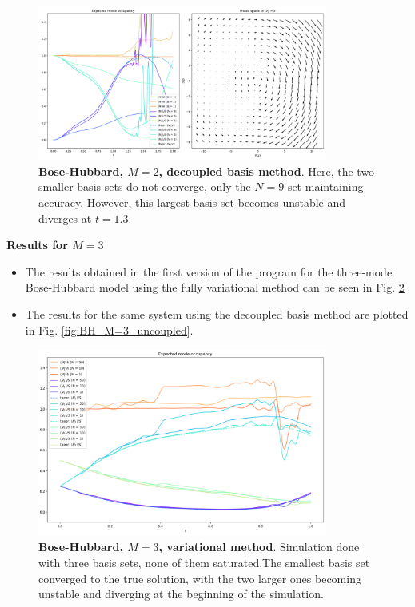 \documentclass[12pt]{article}
\begin{document}
	\begin{figure}
	\begin{center}
	\includegraphics[width=0.85\textwidth]{images/BH_M=2_uncoupled_basis}
	\caption{\textbf{Bose-Hubbard, $M=2$, decoupled basis method}. Here, the two smaller basis sets do not converge, only the $N=9$ set maintaining accuracy. However, this largest basis set becomes unstable and diverges at $t=1.3$.}\label{fig:BH_M=2_uncoupled}
	\end{center}
	\end{figure}
	
	\textbf{Results for $M=3$}
	\begin{itemize}
	\item The results obtained in the first version of the program for the three-mode Bose-Hubbard model using the fully variational method can be seen in Fig. \ref{fig:BH_M=3_variational}
	\item The results for the same system using the decoupled basis method are plotted in Fig. \ref{fig:BH_M=3_uncoupled}.
	\end{itemize}
	
	\begin{figure}
	\begin{center}
	\vspace{-2cm}
	\includegraphics[width=0.85\textwidth]{images/BH_M=3}
	\caption{\textbf{Bose-Hubbard, $M=3$, variational method}. Simulation done with three basis sets, none of them saturated.The smallest basis set converged to the true solution, with the two larger ones becoming unstable and diverging at the beginning of the simulation.}\label{fig:BH_M=3_variational}
	\end{center}
	\end{figure}
	
\end{document}
